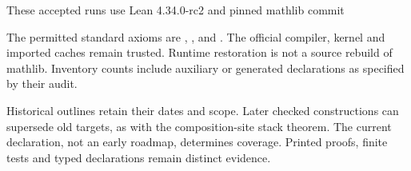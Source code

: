 These accepted runs use Lean 4.34.0-rc2 and pinned mathlib commit
\begin{quote}\small{}\end{quote}
The permitted standard axioms are , , and . The official compiler, kernel and imported caches remain trusted. Runtime restoration is not a source rebuild of mathlib. Inventory counts include auxiliary or generated declarations as specified by their audit.

Historical outlines retain their dates and scope. Later checked constructions can supersede old targets, as with the composition-site stack theorem. The current declaration, not an early roadmap, determines coverage. Printed proofs, finite tests and typed declarations remain distinct evidence.
